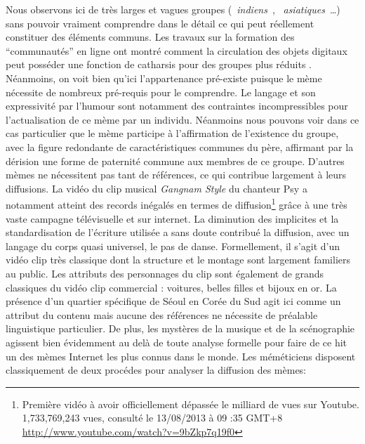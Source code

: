 Nous observons ici de tr\`es larges et vagues groupes ({\guillemotleft}~\textit{indiens}~{\guillemotright}, {\guillemotleft}~\textit{asiatiques}~{\guillemotright}{\dots}) sans pouvoir vraiment comprendre dans le d\'etail ce qui peut r\'eellement constituer des \'el\'ements communs. Les travaux sur la formation des {\textquotedblleft}communaut\'es{\textquotedblright} en ligne ont montr\'e comment la circulation des objets digitaux peut poss\'eder une fonction de catharsis pour des groupes plus r\'eduits \citep{Steyer2006}. N\'eanmoins, on voit bien qu{\textquoteright}ici l{\textquoteright}appartenance pr\'e-existe puisque le m\`eme n\'ecessite de nombreux pr\'e-requis pour le comprendre. Le langage et son expressivit\'e par l{\textquoteright}humour sont notamment des contraintes incompressibles pour l{\textquoteright}actualisation de ce m\`eme par un individu. N\'eanmoins nous pouvons voir dans ce cas particulier que le m\`eme participe \`a l{\textquoteright}affirmation de l{\textquoteright}existence du groupe, avec la figure redondante de caract\'eristiques communes du p\`ere, affirmant par la d\'erision une forme de paternit\'e commune aux membres de ce groupe. D{\textquoteright}autres m\`emes ne n\'ecessitent pas tant de r\'ef\'erences, ce qui contribue largement \`a leurs diffusions. La vid\'eo du clip musical \textit{Gangnam Style} du chanteur Psy a notamment atteint des records in\'egal\'es en termes de diffusion\footnote{ Premi\`ere vid\'eo \`a avoir officiellement d\'epass\'ee le milliard de vues sur Youtube. 1,733,769,243 vues, consult\'e le 13/08/2013 \`a 09 :35 GMT+8 \url{http://www.youtube.com/watch?v=9bZkp7q19f0}} gr\^ace \`a une tr\`es vaste campagne t\'el\'evisuelle et sur internet. La diminution des implicites et la standardisation de l{\textquoteright}\'ecriture utilis\'ee a sans doute contribu\'e la diffusion, avec un langage du corps quasi universel, le pas de danse. Formellement, il s{\textquoteright}agit d{\textquoteright}un vid\'eo clip tr\`es classique dont la structure et le montage sont largement familiers au public. Les attributs des personnages du clip sont \'egalement de grands classiques du vid\'eo clip commercial : voitures, belles filles et bijoux en or. La pr\'esence d{\textquoteright}un quartier sp\'ecifique de S\'eoul en Cor\'ee du Sud agit ici comme un attribut du contenu mais aucune des r\'ef\'erences ne n\'ecessite de pr\'ealable linguistique particulier. De plus, les myst\`eres de la musique et de la sc\'enographie agissent bien \'evidemment au del\`a de toute analyse formelle pour faire de ce hit un des m\`emes Internet les plus connus dans le monde. 
Les m\'em\'eticiens disposent classiquement de deux proc\'edes pour
analyser la diffusion des m\`emes: 

